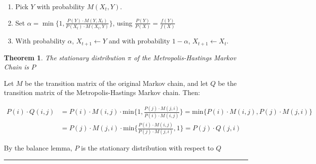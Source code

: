 \documentclass[twoside]{article}
\newcounter{lecnum}
\def\beginrefs{\begin{list}%
        {[\arabic{equation}]}{\usecounter{equation}
         \setlength{\leftmargin}{2.0truecm}\setlength{\labelsep}{0.4truecm}%
         \setlength{\labelwidth}{1.6truecm}}}
\def\endrefs{\end{list}}
\def\bibentry#1{\item[\hbox{[#1]}]}
\newtheorem{theorem}{Theorem}[lecnum]
\newenvironment{proof}{{\bf Proof:}}{\hfill\rule{2mm}{2mm}}
\begin{document}
\begin{enumerate}
   \item Pick $Y$ with probability $M(X_t, Y)$.
   \item Set $\alpha = \min\{ 1, \frac{P(Y) \cdot M(Y, X_t)}{P(X_t) \cdot M(X_t, Y)} \}$, using $\frac{P(Y)}{P(X)} = \frac{f(Y)}{f(X)}$
   \item With probability $\alpha$, $X_{t+1} \leftarrow Y$ and with probability $1 - \alpha$, $X_{t+1} \leftarrow X_t$.
\end{enumerate}

\begin{theorem}
  The stationary distribution $\pi$ of the Metropolis-Hastings Markov Chain is $P$
\end{theorem}

\begin{proof}
Let $M$ be the transition matrix of the original Markov chain, and let $Q$ be the transition matrix of the Metropolis-Hastings Markov chain. Then:

\begin{equation*}
\begin{split}
P(i) \cdot Q(i,j)  & = P(i) \cdot M(i,j) \cdot \mbox{min}\{1, \frac{P(j) \cdot M(j,i)}{P(i) \cdot M(i,j)}\} = \mbox{min}\{P(i) \cdot M(i,j), P(j) \cdot M(j,i) \} \\
& = P(j) \cdot M(j,i) \cdot \mbox{min}\{\frac{P(i) \cdot M(i,j)}{P(j) \cdot M(j,i)}, 1 \} = P(j) \cdot Q(j, i)
\end{split}
\end{equation*}

By the balance lemma, $P$ is the stationary distribution with respect to $Q$
\end{proof}


\end{document}
